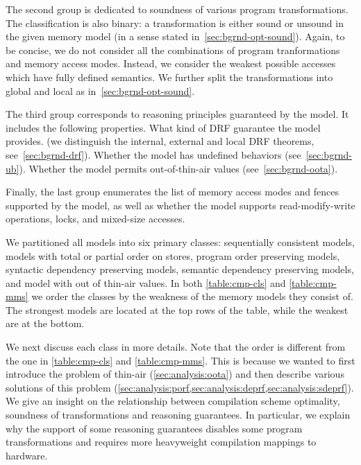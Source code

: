 The second group is dedicated to soundness of various program transformations. 
The classification is also binary: a transformation is either sound or unsound 
in the given memory model (in a sense stated in~\cref{sec:bgrnd-opt-sound}).
Again, to be concise, we do not consider all the combinations 
of program tranformations and memory access modes. 
Instead, we consider the weakest possible accesses which have fully defined semantics. 
We further split the transformations into global and local as in~\cref{sec:bgrnd-opt-sound}.

The third group corresponds to reasoning principles guaranteed by the model. 
It includes the following properties. What kind of DRF guarantee the model provides.
(we distinguish the internal, external and local DRF theorems, see~\cref{sec:bgrnd-drf}).
Whether the model has undefined behaviors (see~\cref{sec:bgrnd-ub}).
Whether the model permits out-of-thin-air values (see~\cref{sec:bgrnd-oota}).

Finally, the last group enumerates the list of memory access modes 
and fences supported by the model, as well as whether the model 
supports read-modify-write operations, locks, and mixed-size accesses.

We partitioned all models into six primary classes: 
sequentially consistent models, models with total or partial order on stores, 
program order preserving models, syntactic dependency preserving models, 
semantic dependency preserving models, and model with out of thin-air values.
In both \cref{table:cmp-cls} and \cref{table:cmp-mms} we order
the classes by the weakness of the memory models they consist of.  
The strongest models are located at the top rows of the table, 
while the weakest are at the bottom. 

We next discuss each class in more details.
Note that the order is different from the one 
in \cref{table:cmp-cls} and \cref{table:cmp-mms}.
This is because we wanted to first introduce the problem 
of thin-air (\cref{sec:analysis:oota}) and then describe 
various solutions of this problem
(\cref{sec:analysis:porf,sec:analysis:deprf,sec:analysis:sdeprf}).
We give an insight on the relationship between compilation scheme optimality, 
soundness of transformations and reasoning guarantees.
In particular, we explain why the support of some reasoning guarantees 
disables some program transformations and requires more heavyweight 
compilation mappings to hardware.
